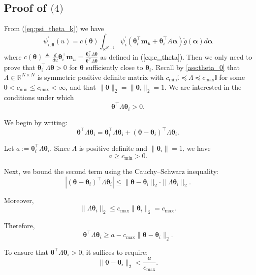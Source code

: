 \documentclass{article} %
\def\eqref#1{equation~\ref{#1}}
\renewcommand{\eqref}[1]{(\ref{#1})}
\begin{document}
\subsection{Proof of $\textit{(4)}$}
From \eqref{eq:psi_theta_k} we have 
$$
\psi^{\prime}_{i,\boldsymbol{\theta}}(u) = c(\boldsymbol{\theta})\int_{\mathbb{R}^{N-1}} \psi_i^{\prime}\left(\boldsymbol{\theta}_i^{\top}\mathbf{m}_u+\boldsymbol{\theta}_i^{\top}A \boldsymbol{\alpha}\right) \tilde{g}(\boldsymbol{\alpha})d\boldsymbol{\alpha}
$$
where $c(\boldsymbol{\theta}) \triangleq \frac{d}{du} \boldsymbol{\theta}_i^{\top}\mathbf{m}_u = \frac{\boldsymbol{\theta}_i^{\top}\Lambda \boldsymbol{\theta}}{\boldsymbol{\theta}^{\top}\Lambda \boldsymbol{\theta}}$ as defined in \eqref{eq:c_theta}. Then we only need to prove that $\boldsymbol{\theta}_i^{\top}\Lambda \boldsymbol{\theta}>0$ for $\boldsymbol{\theta}$ sufficiently close to $\boldsymbol{\theta}_i$. Recall by \cref{ass:theta_0} that \( \Lambda \in \mathbb{R}^{N \times N} \) is symmetric positive definite matrix with $c_{\min} \mathbb{I}\preccurlyeq \Lambda \preccurlyeq c_{\max} \mathbb{I}$ for some $0 < c_{\min} \leq c_{\max} <\infty$, and that \( \|\boldsymbol{\theta}\|_2 = \|\boldsymbol{\theta}_i\|_2 = 1 \). We are interested in the conditions under which
\[
\boldsymbol{\theta}^\top \Lambda \boldsymbol{\theta}_i > 0.
\]

We begin by writing:
\[
\boldsymbol{\theta}^\top \Lambda \boldsymbol{\theta}_i = \boldsymbol{\theta}_i^\top \Lambda \boldsymbol{\theta}_i + (\boldsymbol{\theta} - \boldsymbol{\theta}_i)^\top \Lambda \boldsymbol{\theta}_i.
\]

Let \( a := \boldsymbol{\theta}_i^\top \Lambda \boldsymbol{\theta}_i \). Since \( \Lambda \) is positive definite and \( \|\boldsymbol{\theta}_i\| = 1 \), we have
\[
a \geq c_{\min} > 0.
\]

Next, we bound the second term using the Cauchy--Schwarz inequality:
\[
|(\boldsymbol{\theta} - \boldsymbol{\theta}_i)^\top \Lambda \boldsymbol{\theta}_i| \leq \|\boldsymbol{\theta} - \boldsymbol{\theta}_i\|_2  \cdot \|\Lambda \boldsymbol{\theta}_i\|_2.
\]

Moreover,
\[
\|\Lambda \boldsymbol{\theta}_i\|_2 \leq c_{\max} \|\boldsymbol{\theta}_i\|_2 = c_{\max}.
\]

Therefore,
\[
\boldsymbol{\theta}^\top \Lambda \boldsymbol{\theta}_i \geq a - c_{\max}  \|\boldsymbol{\theta} - \boldsymbol{\theta}_i\|_2.
\]

To ensure that \( \boldsymbol{\theta}^\top \Lambda \boldsymbol{\theta}_i > 0 \), it suffices to require:
\[
\|\boldsymbol{\theta} - \boldsymbol{\theta}_i\|_2 < \frac{a}{c_{\max}}.
\]
\end{document}
